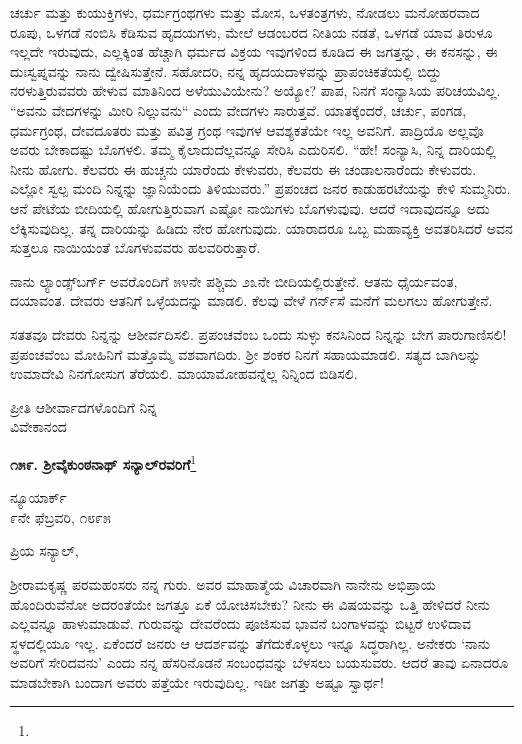 ಚರ್ಚು ಮತ್ತು ಕುಯುಕ್ತಿಗಳು, ಧರ್ಮಗ್ರಂಥಗಳು ಮತ್ತು ಮೋಸ, ಒಳತಂತ್ರಗಳು, ನೋಡಲು ಮನೋಹರವಾದ ರೂಪು, ಒಳಗಡೆ ನಂಬಿಸಿ ಕೆಡಿಸುವ ಹೃದಯಗಳು, ಮೇಲೆ ಆಡಂಬರದ ನೀತಿಯ ನಡತೆ, ಒಳಗಡೆ ಯಾವ ತಿರುಳೂ ಇಲ್ಲದೇ ಇರುವುದು, ಎಲ್ಲಕ್ಕಿಂತ ಹೆಚ್ಚಾಗಿ ಧರ್ಮದ ವಿಕ್ರಯ ಇವುಗಳಿಂದ ಕೂಡಿದ ಈ ಜಗತ್ತನ್ನು, ಈ ಕನಸನ್ನು, ಈ ದುಃಸ್ವಪ್ನವನ್ನು ನಾನು ದ್ವೇಷಿಸುತ್ತೇನೆ. ಸಹೋದರಿ, ನನ್ನ ಹೃದಯದಾಳವನ್ನು ಪ್ರಾಪಂಚಿಕತೆಯಲ್ಲಿ ಬಿದ್ದು ನರಳುತ್ತಿರುವವರು ಹೇಳುವ ಮಾತಿನಿಂದ ಅಳೆಯುವಿಯೇನು? ಅಯ್ಯೋ? ಪಾಪ, ನಿನಗೆ ಸಂನ್ಯಾಸಿಯ ಪರಿಚಯವಿಲ್ಲ. “ಅವನು ವೇದಗಳನ್ನು ಮೀರಿ ನಿಲ್ಲುವನು“ ಎಂದು ವೇದಗಳು ಸಾರುತ್ತವೆ. ಯಾತಕ್ಕೆಂದರೆ, ಚರ್ಚು, ಪಂಗಡ, ಧರ್ಮಗ್ರಂಥ, ದೇವದೂತರು ಮತ್ತು ಪವಿತ್ರ ಗ್ರಂಥ ಇವುಗಳ ಆವಶ್ಯಕತೆಯೇ ಇಲ್ಲ ಅವನಿಗೆ. ಪಾದ್ರಿಯೊ ಅಲ್ಲವೊ ಅವರು ಬೇಕಾದಷ್ಟು ಬೊಗಳಲಿ. ತಮ್ಮ ಕೈಲಾದುದೆಲ್ಲವನ್ನೂ ಸೇರಿಸಿ ಎದುರಿಸಲಿ. “ಹೇ! ಸಂನ್ಯಾಸಿ, ನಿನ್ನ ದಾರಿಯಲ್ಲಿ ನೀನು ಹೋಗು. ಕೆಲವರು ಈ ಹುಚ್ಚನು ಯಾರೆಂದು ಕೇಳುವರು, ಕೆಲವರು ಈ ಚಂಡಾಲನಾರೆಂದು ಕೇಳುವರು. ಎಲ್ಲೋ ಸ್ವಲ್ಪ ಮಂದಿ ನಿನ್ನನ್ನು ಜ್ಞಾನಿಯೆಂದು ತಿಳಿಯುವರು.” ಪ್ರಪಂಚದ ಜನರ ಕಾಡುಹರಟೆಯನ್ನು ಕೇಳಿ ಸುಮ್ಮನಿರು. ಆನೆ ಪೇಟೆಯ ಬೀದಿಯಲ್ಲಿ ಹೋಗುತ್ತಿರುವಾಗ ಎಷ್ಟೋ ನಾಯಿಗಳು ಬೊಗಳುವುವು. ಆದರೆ ಇದಾವುದನ್ನೂ ಅದು ಲೆಕ್ಕಿಸುವುದಿಲ್ಲ. ತನ್ನ ದಾರಿಯನ್ನು ಹಿಡಿದು ನೇರ ಹೋಗುವುದು. ಯಾರಾದರೂ ಒಬ್ಬ ಮಹಾವ್ಯಕ್ತಿ ಅವತರಿಸಿದರೆ ಅವನ ಸುತ್ತಲೂ ನಾಯಿಯಂತೆ ಬೊಗಳುವವರು ಹಲವರಿರುತ್ತಾರೆ.
\vspace{0.2cm}

ನಾನು ಲ್ಯಾಂಡ್ಸ್‌ಬರ್ಗ್ ಅವರೊಂದಿಗೆ ೫೪ನೇ ಪಶ್ಚಿಮ ೨೩ನೇ ಬೀದಿಯಲ್ಲಿರುತ್ತೇನೆ. ಆತನು ಧೈರ್ಯವಂತ, ದಯಾವಂತ. ದೇವರು ಆತನಿಗೆ ಒಳ್ಳೆಯದನ್ನು ಮಾಡಲಿ. ಕೆಲವು ವೇಳೆ ಗರ್ನ್‌ಸೆ ಮನೆಗೆ ಮಲಗಲು ಹೋಗುತ್ತೇನೆ.

\vspace{0.2cm}

ಸತತವೂ ದೇವರು ನಿನ್ನನ್ನು ಆಶೀರ್ವದಿಸಲಿ. ಪ್ರಪಂಚವೆಂಬ ಒಂದು ಸುಳ್ಳು ಕನಸಿನಿಂದ ನಿನ್ನನ್ನು ಬೇಗ ಪಾರುಗಾಣಿಸಲಿ! ಪ್ರಪಂಚವೆಂಬ ಮೋಹಿನಿಗೆ ಮತ್ತೊಮ್ಮೆ ವಶ\-ವಾಗದಿರು. ಶ‍್ರೀ ಶಂಕರ ನಿನಗೆ ಸಹಾಯಮಾಡಲಿ. ಸತ್ಯದ ಬಾಗಿಲನ್ನು ಉಮಾದೇವಿ ನಿನಗೋಸುಗ ತೆರೆಯಲಿ. ಮಾಯಾಮೋಹವನ್ನೆಲ್ಲ ನಿನ್ನಿಂದ ಬಿಡಿಸಲಿ.
\vspace{0.3cm}

{\flushright
ಪ್ರೀತಿ ಆಶೀರ್ವಾದಗಳೊಂದಿಗೆ ನಿನ್ನ\\ವಿವೇಕಾನಂದ\par}

\begin{center}
\textbf{೧೫೯. ಶ‍್ರೀವೈಕುಂಠನಾಥ್ ಸನ್ಯಾಲ್‌ರವರಿಗೆ}\footnote{}
\end{center}

\begin{flushright}
ನ್ಯೂಯಾರ್ಕ್\\೯ನೇ ಫೆಬ್ರವರಿ, ೧೮೯೫
\end{flushright}

\noindent
ಪ್ರಿಯ ಸನ್ಯಾಲ್,

ಶ‍್ರೀರಾಮಕೃಷ್ಣ ಪರಮಹಂಸರು ನನ್ನ ಗುರು. ಅವರ ಮಾಹಾತ್ಮೆಯ ವಿಚಾರವಾಗಿ ನಾನೇನು ಅಭಿಪ್ರಾಯ ಹೊಂದಿರುವೆನೋ ಅದರಂತೆಯೇ ಜಗತ್ತೂ ಏಕೆ ಯೋಚಿಸಬೇಕು? ನೀನು ಈ ವಿಷಯವನ್ನು ಒತ್ತಿ ಹೇಳಿದರೆ ನೀನು ಎಲ್ಲವನ್ನೂ ಹಾಳುಮಾಡುವೆ. ಗುರುವನ್ನು ದೇವರೆಂದು ಪೂಜಿಸುವ ಭಾವನೆ ಬಂಗಾಳವನ್ನು ಬಿಟ್ಟರೆ ಉಳಿದಾವ ಸ್ಥಳದಲ್ಲಿಯೂ ಇಲ್ಲ. ಏಕೆಂದರೆ ಜನರು ಆ ಆದರ್ಶವನ್ನು ತೆಗೆದುಕೊಳ್ಳಲು ಇನ್ನೂ ಸಿದ್ಧರಾಗಿಲ್ಲ. ಅನೇಕರು ‘ನಾನು ಅವರಿಗೆ ಸೇರಿದವನು’ ಎಂದು ನನ್ನ ಹೆಸರಿನೊಡನೆ ಸಂಬಂಧವನ್ನು ಬೆಳಸಲು ಬಯಸುವರು. ಆದರೆ ತಾವು ಏನಾದರೂ ಮಾಡಬೇಕಾಗಿ ಬಂದಾಗ ಅವರು ಪತ್ತೆಯೇ ಇರುವುದಿಲ್ಲ. ಇಡೀ ಜಗತ್ತು ಅಷ್ಟೂ ಸ್ವಾರ್ಥ!
\vspace{0.3cm}

